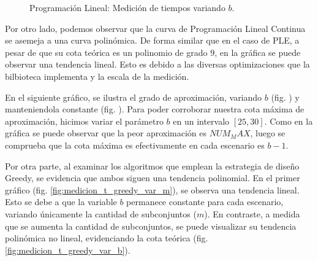 \begin{figure}[h]
\begin{minipage}{0.45\textwidth}
        \caption{Programación Lineal: Medición de tiempos variando $b$.}
        \label{fig:medicion_t_pl_var_b}
    \end{minipage}
\end{figure}

Por otro lado, podemos observar que la curva de Programación Lineal Continua se asemeja a una curva polinómica. De forma similar que en el caso de PLE, a pesar de que su cota teórica es un polinomio de grado $9$, en la gráfica se puede observar una tendencia lineal. Esto es debido a las diversas optimizaciones que la bilbioteca implementa y la escala de la medición.

En el siguiente gráfico, se ilustra el grado de aproximación, variando $b$ (fig. \label{medicion-plc-var-b}) y manteniendola constante (fig. \label{medicion-plc-cons-b}). Para poder corroborar nuestra cota máxima de aproximación, hicimos variar el parámetro $b$ en un intervalo $\left[25,30\right]$. Como en la gráfica se puede observar que la peor aproximación es $NUM_MAX$, luego se comprueba que la cota máxima es efectivamente en cada escenario es $b-1$.

Por otra parte, al examinar los algoritmos que emplean la estrategia de diseño Greedy, se evidencia que ambos siguen una tendencia polinomial. En el primer gráfico (fig. \ref{fig:medicion_t_greedy_var_m}), se observa una tendencia lineal. Esto se debe a que la variable $b$ permanece constante para cada escenario, variando únicamente la cantidad de subconjuntos ($m$). En contraste, a medida que se aumenta la cantidad de subconjuntos, se puede visualizar su tendencia polinómica no lineal, evidenciando la cota teórica (fig. \ref{fig:medicion_t_greedy_var_b}).

